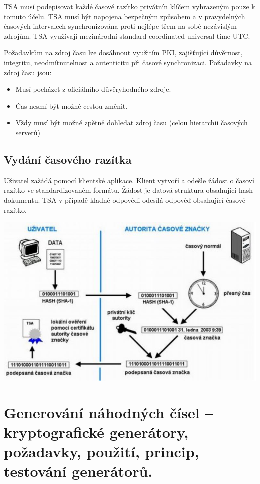 TSA musí podepisovat každé časové razítko privátnín klíčem vyhrazeným pouze k tomuto účelu. TSA musí být napojena bezpečným způsobem a v pravydelných časových intervalech synchronizována proti nejlépe třem na sobě nezávislým zdrojům. TSA využívají mezinárodní standard coordinated universal time UTC.

\noindent Požadavkům na zdroj času lze dosáhnout využitím PKI, zajišťující důvěrnost, integritu, neodmítnutelnost a autenticitu při časové synchronizaci. Požadavky na zdroj času jsou:

\begin{itemize}[noitemsep]
    \item Musí pocházet z oficiálního důvěryhodného zdroje.
    \item Čas nesmí být možné cestou změnit.
    \item Vždy musí být možné zpětně dohledat zdroj času (celou hierarchii časových serverů)
\end{itemize}

\subsection{Vydání časového razítka}

Uživatel zažádá pomocí klientské aplikace. Klient vytvoří a odešle žádost o časoví razítko ve standardizovaném formátu. Žádost je datová struktura obsahující hash dokumentu. TSA v případě kladné odpovědi odesílá odpověď obsahující časové razítko.

\begin{center}
\includegraphics[scale=0.7]{images/Timestamp.jpg}
\end{center}

\clearpage
\section{Generování náhodných čísel -- kryptografické generátory, požadavky, použití, princip, testování generátorů.}

